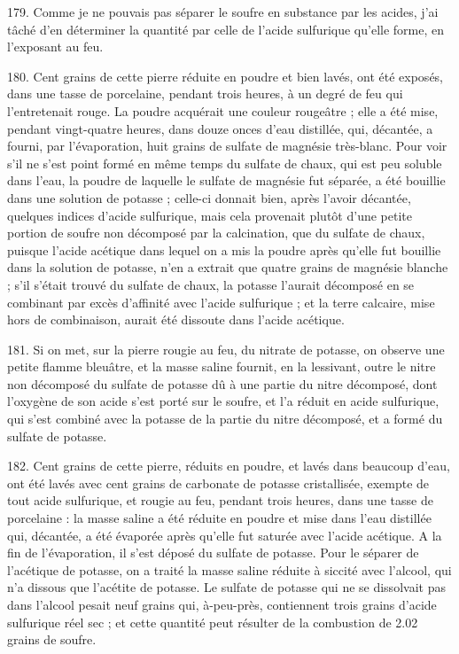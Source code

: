 \documentclass[a4paper, 11pt, oneside, polutonikogreek, french]{article}
\begin{document}
179. Comme je ne pouvais pas séparer le soufre en substance par les acides, j'ai tâché d'en déterminer la quantité par celle de l'acide sulfurique qu'elle forme, en l'exposant au feu.

180. Cent grains de cette pierre réduite en poudre et bien lavés, ont été exposés, dans une tasse de porcelaine, pendant trois heures, à un degré de feu qui l'entretenait rouge. La poudre acquérait une couleur rougeâtre ; elle a été mise, pendant vingt-quatre heures, dans douze onces d'eau distillée, qui, décantée, a fourni, par l'évaporation, huit grains de sulfate de magnésie très-blanc. Pour voir s'il ne s'est point formé en même temps du sulfate de chaux, qui est peu soluble dans l'eau, la poudre de laquelle le sulfate de magnésie fut séparée, a été bouillie dans une solution de potasse ; celle-ci donnait bien, après l'avoir décantée, quelques indices d'acide sulfurique, mais cela provenait plutôt d'une petite portion de soufre non décomposé par la calcination, que du sulfate de chaux, puisque l'acide acétique dans lequel on a mis la poudre après qu'elle fut bouillie dans la solution de potasse, n'en a extrait que quatre grains de magnésie blanche ; s'il s'était trouvé du sulfate de chaux, la potasse l'aurait décomposé en se combinant par excès d'affinité avec l'acide sulfurique ; et la terre calcaire, mise hors de combinaison, aurait été dissoute dans l'acide acétique.

181. Si on met, sur la pierre rougie au feu, du nitrate de potasse, on observe une petite flamme bleuâtre, et la masse saline fournit, en la lessivant, outre le nitre non décomposé du sulfate de potasse dû à une partie du nitre décomposé, dont l'oxygène de son acide s'est porté sur le soufre, et l'a réduit en acide sulfurique, qui s'est combiné avec la potasse de la partie du nitre décomposé, et a formé du sulfate de potasse.

182. Cent grains de cette pierre, réduits en poudre, et lavés dans beaucoup d'eau, ont été lavés avec cent grains de carbonate de potasse cristallisée, exempte de tout acide sulfurique, et rougie au feu, pendant trois heures, dans une tasse de porcelaine : la masse saline a été réduite en poudre et mise dans l'eau distillée qui, décantée, a été évaporée après qu'elle fut saturée avec l'acide acétique. A la fin de l'évaporation, il s'est déposé du sulfate de potasse. Pour le séparer de l'acétique de potasse, on a traité la masse saline réduite à siccité avec l'alcool, qui n'a dissous que l'acétite de potasse. Le sulfate de potasse qui ne se dissolvait pas dans l'alcool pesait neuf grains qui, à-peu-près, contiennent trois grains d'acide sulfurique réel sec ; et cette quantité peut résulter de la combustion de 2.02 grains de soufre.
\end{document}
